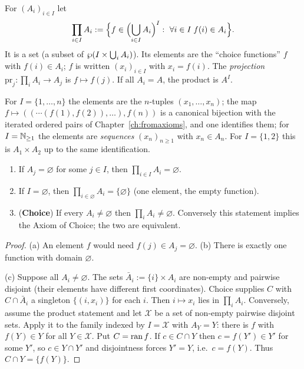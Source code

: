 \begin{definition}\label{def:product}
	For $(A_i)_{i\in I}$ let
	\[
	\prod_{i\in I}A_i:=\Bigl\{f\in\Bigl(\bigcup_{i\in I}A_i\Bigr)^I:\ \forall i\in I\;f(i)\in A_i\Bigr\}.
	\]
	It is a set (a subset of $\wp(I\times\bigcup_iA_i)$). Its elements are the ``choice functions'' $f$ with $f(i)\in A_i$; $f$ is written $(x_i)_{i\in I}$ with $x_i=f(i)$. The \emph{projection} $\mathrm{pr}_j:\prod_iA_i\to A_j$ is $f\mapsto f(j)$. If all $A_i=A$, the product is $A^I$.
\end{definition}

\begin{remark}
	For $I=\{1,\dots,n\}$ the elements are the $n$-tuples $(x_1,\dots,x_n)$; the map $f\mapsto((\cdots(f(1),f(2)),\dots),f(n))$ is a canonical bijection with the iterated ordered pairs of Chapter~\ref{ch:fromaxioms}, and one identifies them; for $I=\mathbb{N}_{\ge1}$ the elements are \emph{sequences} $(x_n)_{n\ge1}$ with $x_n\in A_n$. For $I=\{1,2\}$ this is $A_1\times A_2$ up to the same identification.
\end{remark}

\begin{theorem}\label{thm:prodempty}
	\begin{enumerate}[label=(\alph*)]
		\item If $A_j=\varnothing$ for some $j\in I$, then $\prod_{i\in I}A_i=\varnothing$.
		\item If $I=\varnothing$, then $\prod_{i\in\varnothing}A_i=\{\varnothing\}$ (one element, the empty function).
		\item (\textbf{Choice}) If every $A_i\neq\varnothing$ then $\prod_iA_i\ne\varnothing$. Conversely this statement implies the Axiom of Choice; the two are equivalent.
	\end{enumerate}
\end{theorem}
\begin{proof}
	(a) An element $f$ would need $f(j)\in A_j=\varnothing$. (b) There is exactly one function with domain $\varnothing$.
	
	(c) Suppose all $A_i\neq\varnothing$. The sets $\bar A_i:=\{i\}\times A_i$ are non-empty and pairwise disjoint (their elements have different first coordinates). Choice supplies $C$ with $C\cap\bar A_i$ a singleton $\{(i,x_i)\}$ for each $i$. Then $i\mapsto x_i$ lies in $\prod_iA_i$. Conversely, assume the product statement and let $\mathcal X$ be a set of non-empty pairwise disjoint sets. Apply it to the family indexed by $I=\mathcal X$ with $A_Y=Y$: there is $f$ with $f(Y)\in Y$ for all $Y\in\mathcal X$. Put $C=\operatorname{ran} f$. If $c\in C\cap Y$ then $c=f(Y')\in Y'$ for some $Y'$, so $c\in Y\cap Y'$ and disjointness forces $Y'=Y$, i.e.\ $c=f(Y)$. Thus $C\cap Y=\{f(Y)\}$.
\end{proof}

